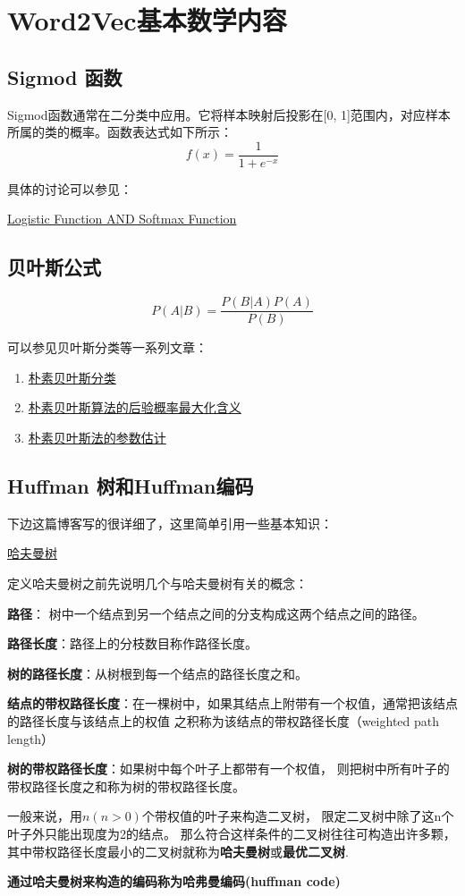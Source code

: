 \chapter{Word2Vec基本数学内容}
\section{Sigmod 函数}
Sigmod函数通常在二分类中应用。它将样本映射后投影在[0, 1]范围内，对应样本所属的类的概率。函数表达式如下所示：
\begin{equation}
    f(x) = \frac{1}{1+e^{-x}}
\end{equation}

具体的讨论可以参见：

\href{http://blog.csdn.net/chunyun0716/article/details/51580342}{Logistic Function AND Softmax Function}

\section{贝叶斯公式}
\begin{equation}
    P(A|B) = \frac{P(B|A)P(A)}{P(B)}
\end{equation}

可以参见贝叶斯分类等一系列文章：
\begin{enumerate}
    \item \href{http://blog.csdn.net/chunyun0716/article/details/51031055}{朴素贝叶斯分类}
    \item \href{http://blog.csdn.net/chunyun0716/article/details/51058948}{朴素贝叶斯算法的后验概率最大化含义}
    \item \href{http://blog.csdn.net/chunyun0716/article/details/51111864}{朴素贝叶斯法的参数估计}
\end{enumerate}

\section{Huffman 树和Huffman编码}
下边这篇博客写的很详细了，这里简单引用一些基本知识：

\href{http://blog.csdn.net/shuangde800/article/details/7341289}{哈夫曼树}


定义哈夫曼树之前先说明几个与哈夫曼树有关的概念：

\textbf{路径}： 树中一个结点到另一个结点之间的分支构成这两个结点之间的路径。

\textbf{路径长度}：路径上的分枝数目称作路径长度。

\textbf{树的路径长度}：从树根到每一个结点的路径长度之和。

\textbf{结点的带权路径长度}：在一棵树中，如果其结点上附带有一个权值，通常把该结点的路径长度与该结点上的权值                                                     之积称为该结点的带权路径长度（weighted path length）

\textbf{树的带权路径长度}：如果树中每个叶子上都带有一个权值，
则把树中所有叶子的带权路径长度之和称为树的带权路径长度。

一般来说，用$n(n>0)$个带权值的叶子来构造二叉树，
限定二叉树中除了这n个叶子外只能出现度为2的结点。
那么符合这样条件的二叉树往往可构造出许多颗，
其中带权路径长度最小的二叉树就称为\textbf{哈夫曼树}或\textbf{最优二叉树}.

\textbf{通过哈夫曼树来构造的编码称为哈弗曼编码(huffman code)}